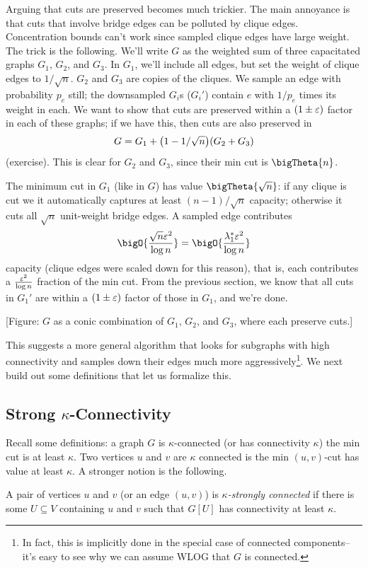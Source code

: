 \documentclass[12pt]{article}
\begin{document}
Arguing that cuts are preserved becomes much trickier. The main annoyance is
that cuts that involve bridge edges can be polluted by clique edges.
Concentration bounds can't work since sampled clique edges have large weight.
The trick is the following. We'll write $G$ as the weighted sum of three
capacitated graphs $G_1$, $G_2$, and $G_3$. In $G_1$, we'll include all edges,
but set the weight of clique edges to $1/\sqrt{n}$. $G_2$ and $G_3$ are copies
of the cliques. We sample an edge with probability $p_e$ still; the downsampled
$G_i$s ($G_i'$) contain $e$ with $1/p_e$ times its weight in each. We want to
show that cuts are preserved within a $(1 \pm \varepsilon)$ factor in each of these
graphs; if we have this, then cuts are also preserved in
\[
  G = G_1 + \paren{1 - 1/\sqrt{n}}(G_2 + G_3)
\]
(exercise). This is clear for $G_2$ and $G_3$, since their min cut is
$\bigTheta{n}$.

The minimum cut in $G_1$ (like in $G$) has value $\bigTheta{\sqrt{n}}$: if any
clique is cut we it automatically captures at least $(n - 1)/\sqrt{n}$ capacity;
otherwise it cuts all $\sqrt{n}$ unit-weight bridge edges. A sampled edge
contributes
\[
  \bigO{\frac{\sqrt{n}\eps^2}{\log n}} = \bigO{\frac{\lambda_1^*\eps^2}{\log n} }
\]
capacity (clique edges were scaled down for this reason), that is, each
contributes a $\frac{\varepsilon^2}{\log n}$ fraction of the min cut. From the previous
section, we know that all cuts in $G_1'$ are within a $(1 \pm \varepsilon)$ factor of
those in $G_1$, and we're done.

\begin{center}
  [Figure: $G$ as a conic combination of $G_1$, $G_2$, and $G_3$,
    where each preserve cuts.]
\end{center}
This suggests a more general algorithm that looks for subgraphs with high
connectivity and samples down their edges much more aggressively\footnote{In
fact, this is implicitly done in the special case of connected components--it's
easy to see why we can assume WLOG that $G$ is connected.}. We next build out
some definitions that let us formalize this.

\subsection{Strong $\kappa$-Connectivity}

Recall some definitions: a graph $G$ is $\kappa$-connected (or has connectivity
$\kappa$) the min cut is at least $\kappa$. Two vertices $u$ and $v$ are
$\kappa$ connected is the min $(u, v)$-cut has value at least $\kappa$. A
stronger notion is the following.
\begin{definition}
  A pair of vertices $u$ and $v$ (or an edge $(u, v)$) is
  \emph{$\kappa$-strongly connected} if there is some $U \subseteq V$ containing
  $u$ and $v$ such that $G[U]$ has connectivity at least $\kappa$.
\end{definition}
\end{document}

